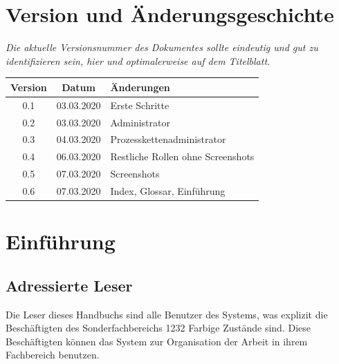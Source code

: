 \documentclass[enabledeprecatedfontcommands,fontsize=12pt,paper=a4,twoside]{scrartcl}
\begin{document}


\newpage

  \thispagestyle{fancy}
  \fancyhead{}
  \fancyfoot{}
  \renewcommand{\headrulewidth}{0.4pt}
  \tableofcontents

\newpage





\section*{Version und Änderungsgeschichte}

{\em Die aktuelle Versionsnummer des Dokumentes sollte eindeutig und gut zu
identifizieren sein, hier und optimalerweise auf dem Titelblatt.}

\begin{tabular}{ccl}
Version & Datum & Änderungen \\
\hline
0.1 & 03.03.2020 & Erste Schritte \\
0.2 & 03.03.2020 & Administrator \\
0.3 & 04.03.2020 & Prozesskettenadministrator \\
0.4 & 06.03.2020 & Restliche Rollen ohne Screenshots \\
0.5 & 07.03.2020 & Screenshots \\
0.6 & 07.03.2020 & Index, Glossar, Einführung \\
\end{tabular}


\newpage
\section{Einführung}
\subsection{Adressierte Leser}
Die Leser dieses Handbuchs sind alle Benutzer des Systems, was explizit die Beschäftigten des Sonderfachbereichs 1232 Farbige Zustände sind. Diese Beschäftigten können das System zur Organisation der Arbeit in ihrem Fachbereich benutzen. \\
\end{document}

